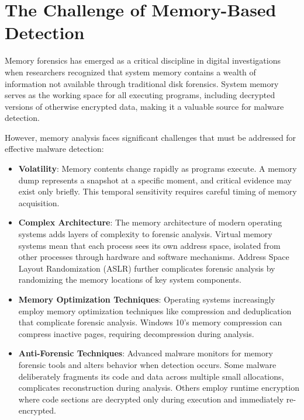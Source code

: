 \section{The Challenge of Memory-Based Detection}
\label{sec:memory_challenge}

Memory forensics has emerged as a critical discipline in digital investigations when researchers recognized that system memory contains a wealth of information not available through traditional disk forensics. System memory serves as the working space for all executing programs, including decrypted versions of otherwise encrypted data, making it a valuable source for malware detection.

However, memory analysis faces significant challenges that must be addressed for effective malware detection:

\begin{itemize}
    \item \textbf{Volatility}: Memory contents change rapidly as programs execute. A memory dump represents a snapshot at a specific moment, and critical evidence may exist only briefly. This temporal sensitivity requires careful timing of memory acquisition.
    
    \item \textbf{Complex Architecture}: The memory architecture of modern operating systems adds layers of complexity to forensic analysis. Virtual memory systems mean that each process sees its own address space, isolated from other processes through hardware and software mechanisms. Address Space Layout Randomization (ASLR) further complicates forensic analysis by randomizing the memory locations of key system components.
    
    \item \textbf{Memory Optimization Techniques}: Operating systems increasingly employ memory optimization techniques like compression and deduplication that complicate forensic analysis. Windows 10's memory compression can compress inactive pages, requiring decompression during analysis.
    
    \item \textbf{Anti-Forensic Techniques}: Advanced malware monitors for memory forensic tools and alters behavior when detection occurs. Some malware deliberately fragments its code and data across multiple small allocations, complicates reconstruction during analysis. Others employ runtime encryption where code sections are decrypted only during execution and immediately re-encrypted.
\end{itemize}

